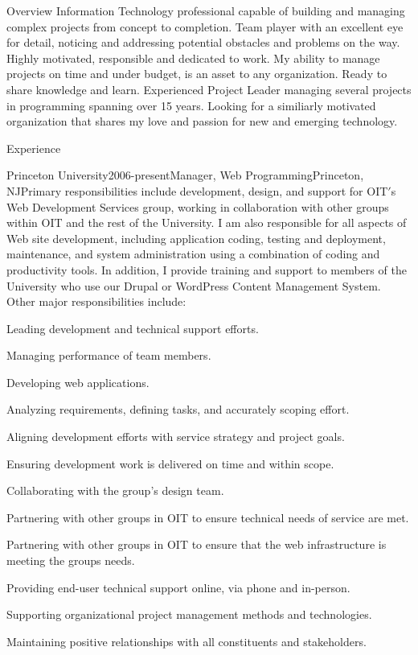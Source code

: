 \documentclass[12pt]{resume}
\begin{document}
\begin{rSection}{Overview}
Information Technology professional capable of building and managing complex projects from concept to completion. Team player with an excellent eye for detail, noticing and addressing potential obstacles and problems on the way. Highly motivated, responsible and dedicated to work. My ability to manage projects on time and under budget, is an asset to any organization. Ready to share knowledge and learn. Experienced Project Leader managing several projects in programming spanning over 15 years. Looking for a similiarly motivated organization that shares my love and passion for new and emerging technology.
\end{rSection}

\begin{rSection}{Experience}

\begin{rSubsection}{Princeton University}{2006-present}{Manager, Web Programming}{Princeton, NJ}{Primary responsibilities include development, design, and support for OIT$'$s Web Development Services group, working in collaboration with other groups within OIT and the rest of the University. I am also responsible for all aspects of Web site development, including application coding, testing and deployment, maintenance, and system administration using a combination of coding and productivity tools. In addition, I provide training and support to members of the University who use our Drupal or WordPress Content Management System. Other major responsibilities include:}
\item Leading development and technical support efforts.
\item Managing performance of team members.
\item Developing web applications.
\item Analyzing requirements, defining tasks, and accurately scoping effort.
\item Aligning development efforts with service strategy and project goals.
\item Ensuring development work is delivered on time and within scope.
\item Collaborating with the group’s design team.
\item Partnering with other groups in OIT to ensure technical needs of service are met.
\item Partnering with other groups in OIT to ensure that the web infrastructure is meeting the groups needs.
\item Providing end-user technical support online, via phone and in-person.
\item Supporting organizational project management methods and technologies.
\item Maintaining positive relationships with all constituents and stakeholders.
\end{rSubsection}


\end{rSection}
\end{document}
